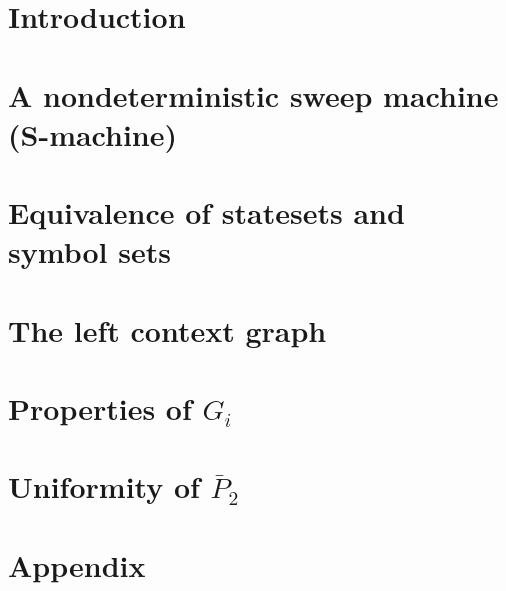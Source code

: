 \documentclass{article}
\begin{document}
\section{Introduction}\label{sec:introduction}


\section{A nondeterministic sweep machine (S-machine)}\label{sec:s_machine_definition}


\section{Equivalence of statesets and symbol sets}\label{sec:two}
\section{The left context graph}\label{sec:three}
\section{Properties of $G_i$}\label{sec:four}
\section{Uniformity of $\bar{P}_2$}\label{sec:five}
\section{Appendix}\label{sec:appendix}

\end{document}
